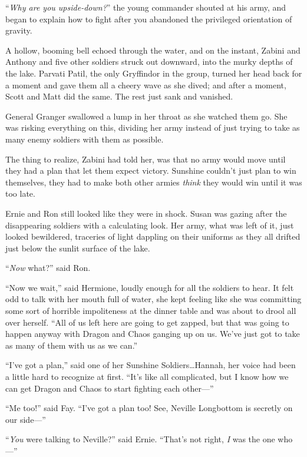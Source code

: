 “\emph{Why are you upside-down?}” the young commander shouted at his army, and began to explain how to fight after you abandoned the privileged orientation of gravity.

\later

A hollow, booming bell echoed through the water, and on the instant, Zabini and Anthony and five other soldiers struck out downward, into the murky depths of the lake. Parvati Patil, the only Gryffindor in the group, turned her head back for a moment and gave them all a cheery wave as she dived; and after a moment, Scott and Matt did the same. The rest just sank and vanished.

General Granger swallowed a lump in her throat as she watched them go. She was risking everything on this, dividing her army instead of just trying to take as many enemy soldiers with them as possible.

The thing to realize, Zabini had told her, was that no army would move until they had a plan that let them expect victory. Sunshine couldn’t just plan to win themselves, they had to make both other armies \emph{think} they would win until it was too late.

Ernie and Ron still looked like they were in shock. Susan was gazing after the disappearing soldiers with a calculating look. Her army, what was left of it, just looked bewildered, traceries of light dappling on their uniforms as they all drifted just below the sunlit surface of the lake.

“\emph{Now} what?” said Ron.

“Now we wait,” said Hermione, loudly enough for all the soldiers to hear. It felt odd to talk with her mouth full of water, she kept feeling like she was committing some sort of horrible impoliteness at the dinner table and was about to drool all over herself.
“All of us left here are going to get zapped, but that was going to happen anyway with Dragon and Chaos ganging up on us. We’ve just got to take as many of them with us as we can.”

“I’ve got a plan,” said one of her Sunshine Soldiers…Hannah, her voice had been a little hard to recognize at first.
“It’s like all complicated, but I know how we can get Dragon and Chaos to start fighting each other—”

“Me too!” said Fay.
“I’ve got a plan too! See, Neville Longbottom is secretly on our side—”

“\emph{You} were talking to Neville?” said Ernie.
“That’s not right, \emph{I} was the one who—”

